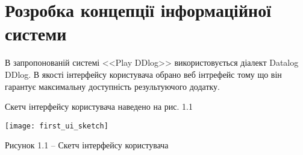 \newpage

\section{Розробка концепції інформаційної системи}

В запропонованій системі <<Play DDlog>> використовується діалект Datalog DDlog.  В якості інтерфейсу користувача обрано веб інтрефейс тому що він гарантує максимальну доступність результуючого додатку.

Скетч інтерфейсу користувача наведено на рис. 1.1

\begin{center}
\texttt{[image: first\_ui\_sketch]}

Рисунок 1.1 -- Скетч інтерфейсу користувача

\end{center}
